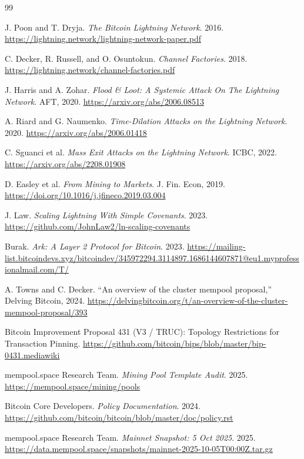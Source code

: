 \documentclass{article}
\theoremstyle{definition}
\begin{document}
\begin{thebibliography}{99}

 J. Poon and T. Dryja.
\emph{The Bitcoin Lightning Network}. 2016. \url{https://lightning.network/lightning-network-paper.pdf}

 C. Decker, R. Russell, and O. Osuntokun.
\emph{Channel Factories}. 2018. \url{https://lightning.network/channel-factories.pdf}

 J. Harris and A. Zohar.
\emph{Flood \& Loot: A Systemic Attack On The Lightning Network}. AFT, 2020. \url{https://arxiv.org/abs/2006.08513}

 A. Riard and G. Naumenko.
\emph{Time-Dilation Attacks on the Lightning Network}. 2020. \url{https://arxiv.org/abs/2006.01418}

 C. Sguanci et al.
\emph{Mass Exit Attacks on the Lightning Network}.
ICBC, 2022. \url{https://arxiv.org/abs/2208.01908}

 D. Easley et al.
\emph{From Mining to Markets}. J. Fin. Econ, 2019. \url{https://doi.org/10.1016/j.jfineco.2019.03.004}

 J. Law.
\emph{Scaling Lightning With Simple Covenants}. 2023. \url{https://github.com/JohnLaw2/ln-scaling-covenants}

 Burak. \emph{Ark: A Layer 2 Protocol for Bitcoin}.
2023. \url{https://mailing-list.bitcoindevs.xyz/bitcoindev/345972294.3114897.1686144607871@eu1.myprofessionalmail.com/T/}

 A. Towns and C. Decker.
``An overview of the cluster mempool proposal,'' Delving Bitcoin, 2024. \url{https://delvingbitcoin.org/t/an-overview-of-the-cluster-mempool-proposal/393}

 Bitcoin Improvement Proposal 431 (V3 / TRUC): Topology Restrictions for Transaction Pinning. \url{https://github.com/bitcoin/bips/blob/master/bip-0431.mediawiki}

 mempool.space Research Team.
\emph{Mining Pool Template Audit}. 2025. \url{https://mempool.space/mining/pools}

 Bitcoin Core Developers.
\emph{Policy Documentation}. 2024. \url{https://github.com/bitcoin/bitcoin/blob/master/doc/policy.rst}

 mempool.space Research Team.
\emph{Mainnet Snapshot: 5 Oct 2025}. 2025. \url{https://data.mempool.space/snapshots/mainnet-2025-10-05T00:00Z.tar.gz}


\end{thebibliography}
\end{document}
